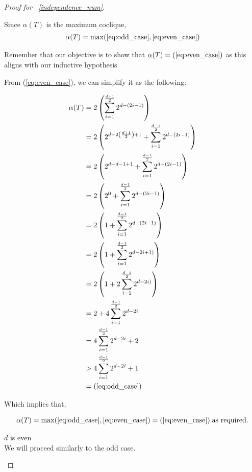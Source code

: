 \begin{proof}[Proof for ~\ref{independence_num}]
\begin{caseof}
\begin{subcaseof}
		\end{subcaseof}

		Since $\alpha(T)$ is the maximum coclique,
		\begin{align*}
			\alpha(T) = \max(\ref{eq:odd_case}, \ref{eq:even_case})
		\end{align*}

		Remember that our objective is to show that $\alpha(T) = (\ref{eq:even_case})$ as this aligns with our inductive hypothesis.

		From (\ref{eq:even_case}), we can simplify it as the following:

		\begin{align*}
			\alpha(T) & = 2\left(\displaystyle\sum_{i = 1}^{\frac{d + 1}{2}}2^{d - (2i - 1)}\right)  \\
				  & = 2\left(2^{d - 2\left(\frac{d + 1}{2}\right) + 1} + \displaystyle\sum_{i = 1}^{\frac{d - 1}{2}}2^{d - (2i - 1)}\right)\\
				  & = 2\left(2^{d - d - 1 + 1} + \displaystyle\sum_{i = 1}^{\frac{d - 1}{2}}2^{d - (2i - 1)}\right)\\
				  & = 2\left(2^0 + \displaystyle\sum_{i = 1}^{\frac{d - 1}{2}}2^{d - (2i - 1)}\right)\\
				  & = 2\left(1 + \displaystyle\sum_{i = 1}^{\frac{d - 1}{2}}2^{d - (2i - 1)}\right)\\
				  & = 2\left(1 + \displaystyle\sum_{i = 1}^{\frac{d - 1}{2}}2^{d - 2i + 1)}\right)\\
				  & = 2\left(1 + 2\displaystyle\sum_{i = 1}^{\frac{d - 1}{2}}2^{d - 2i)}\right)\\
				  & = 2 + 4\displaystyle\sum_{i = 1}^{\frac{d - 1}{2}}2^{d - 2i}\\
				  & = 4\displaystyle\sum_{i = 1}^{\frac{d - 1}{2}}2^{d - 2i} + 2 \\
				  & > 4\displaystyle\sum_{i = 1}^{\frac{d - 1}{2}}2^{d - 2i} + 1 \\
				  & = (\ref{eq:odd_case})
		\end{align*}

		Which implies that,

		\begin{align*}
			\alpha(T) = \max(\ref{eq:odd_case}, \ref{eq:even_case}) = (\ref{eq:even_case})\; \text{as required.}
		\end{align*}

	\item $d$ is even \\

		We will proceed similarly to the odd case.


\end{caseof}
\end{proof}
